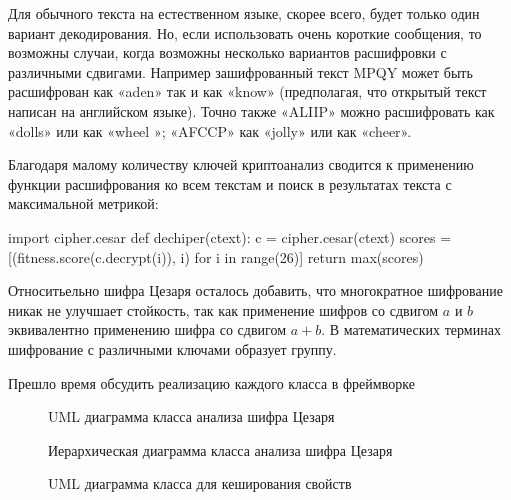 Для обычного текста на естественном языке, скорее всего, будет 
только один вариант декодирования. Но, если использовать очень 
короткие сообщения, то возможны случаи, когда возможны несколько 
вариантов расшифровки с различными сдвигами. Например зашифрованный 
текст MPQY может быть расшифрован как «aden» так и как «know» 
(предполагая, что открытый текст написан на английском языке). 
Точно также «ALIIP» можно расшифровать как «dolls» или как «wheel
»; «AFCCP» как «jolly» или как «cheer».

Благодаря малому количеству ключей криптоанализ сводится
к применению функции расшифрования ко всем текстам и 
поиск в результатах текста с максимальной метрикой: 

\begin{listing}[1]{1}
import cipher.cesar
def dechiper(ctext):
    c = cipher.cesar(ctext)
    scores = [(fitness.score(c.decrypt(i)), i) for i in range(26)]
    return max(scores)
\end{listing}

Относитьельно шифра Цезаря осталось добавить, что
многократное шифрование никак не улучшает стойкость, так как 
применение шифров со сдвигом $a$ и $b$ эквивалентно применению шифра 
со сдвигом $a+b$. В математических терминах шифрование с различными 
ключами образует группу.

Прешло время обсудить реализацию каждого класса в фреймворке 

\begin{figure}[h]
\noindent{}
\caption{UML диаграмма класса анализа шифра Цезаря}
\label{figUCesar}
\end{figure}


\begin{figure}[h]
\noindent{}
\caption{Иерархическая диаграмма класса анализа шифра Цезаря}
\label{figICesar}
\end{figure}


\begin{figure}[h]
\noindent{}
\caption{UML диаграмма класса для кеширования свойств}
\label{figCached}
\end{figure}
